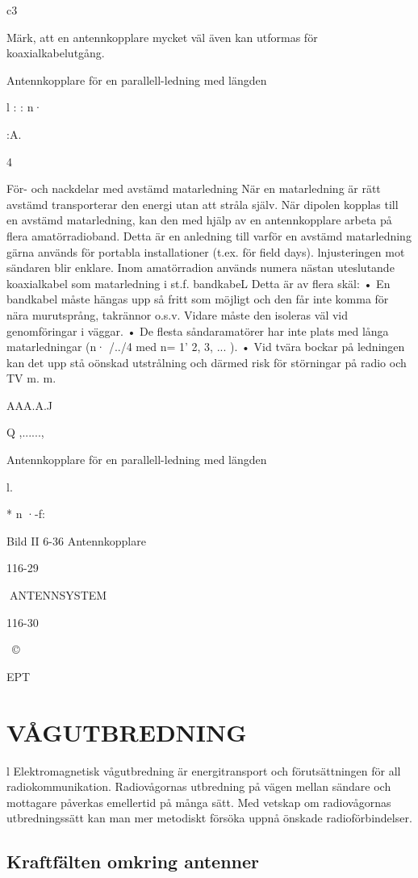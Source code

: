 \documentclass[a4paper,twoside,twocolumn,openright]{book}
\begin{document}
{{{{{{c3

Märk, att en antennkopplare mycket väl
även kan utformas för koaxialkabelutgång.

Antennkopplare för en
parallell-ledning med längden

l : : n·

:A.

4

För- och nackdelar med avstämd matarledning
När en matarledning är rätt avstämd
transporterar den energi utan att stråla själv.
När dipolen kopplas till en avstämd matarledning, kan den med hjälp av en antennkopplare arbeta på flera amatörradioband. Detta är en anledning till varför en
avstämd matarledning gärna används för
portabla installationer (t.ex. för field days).
lnjusteringen mot sändaren blir enklare.
Inom amatörradion används numera nästan uteslutande koaxialkabel som matarledning i st.f. bandkabeL Detta är av flera
skäl:
• En bandkabel måste hängas upp så fritt
som möjligt och den får inte komma för nära
murutsprång, takrännor o.s.v. Vidare måste
den isoleras väl vid genomföringar i väggar.
• De flesta såndaramatörer har inte plats
med långa matarledningar (n· /../4 med n=
1' 2, 3, ... ).
• Vid tvära bockar på ledningen kan det upp
stå oönskad utstrålning och därmed risk för
störningar på radio och TV m. m.

AAA.A.J

Q
,......,

Antennkopplare för en
parallell-ledning med längden

l.

* n ·-f:

Bild II 6-36 Antennkopplare

116-29

ANTENNSYSTEM

116-30

~©~

EPT

\chapter{VÅGUTBREDNING}

l
Elektromagnetisk vågutbredning är energitransport och förutsättningen för all radiokommunikation. Radiovågornas utbredning
på vägen mellan sändare och mottagare
påverkas emellertid på många sätt. Med
vetskap om radiovågornas utbredningssätt
kan man mer metodiskt försöka uppnå önskade radioförbindelser.

\section{Kraftfälten omkring antenner}

}}}}}}
\end{document}
